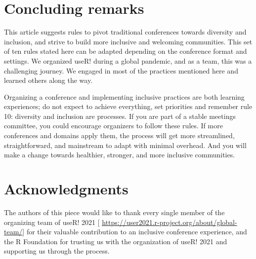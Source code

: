 \documentclass[10pt,letterpaper]{article}
\begin{document}

\section*{Concluding remarks}

This article suggests rules to pivot traditional conferences towards diversity and inclusion, and strive to build more inclusive and welcoming communities. 
This set of ten rules stated here can be adapted depending on the conference format and settings.
We organized useR! during a global pandemic, and as a team, this was a challenging journey. 
We engaged in most of the practices mentioned here and learned others along the way. 

Organizing a conference and implementing inclusive practices are both learning experiences;
do not expect to achieve everything, set priorities and remember rule 10: diversity and inclusion are processes. 
If you are part of a stable meetings committee, you could encourage organizers to follow these rules. 
If more conferences and domains apply them, the process will get more streamlined, straightforward, and mainstream to adapt with minimal overhead.
And you will make a change towards healthier, stronger, and more inclusive communities.


\section*{Acknowledgments}
The authors of this piece would like to thank every single member of the organizing team of useR! 2021 [ \url{https://user2021.r-project.org/about/global-team/}] for their valuable contribution to an inclusive conference experience, and the R Foundation for trusting us with the organization of useR! 2021 and supporting us through the process. 
\end{document}

